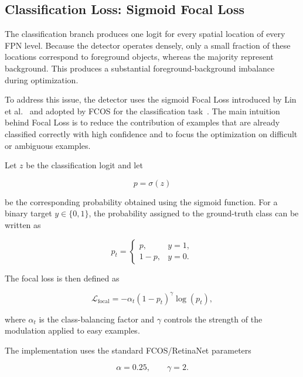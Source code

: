 \documentclass[11pt,a4paper]{article}
\begin{document}
\subsection{Classification Loss: Sigmoid Focal Loss}
\label{subsec:classification_loss}

The classification branch produces one logit for every spatial location of
every FPN level. Because the detector operates densely, only a small
fraction of these locations correspond to foreground objects, whereas the
majority represent background. This produces a substantial
foreground-background imbalance during optimization.

To address this issue, the detector uses the sigmoid Focal Loss introduced by
Lin et al.~\cite{lin2017focal} and adopted by FCOS for the classification
task~\cite{tian2019fcos}. The main intuition behind Focal Loss is to reduce
the contribution of examples that are already classified correctly with
high confidence and to focus the optimization on difficult or ambiguous
examples.

Let $z$ be the classification logit and let

\begin{equation}
p = \sigma(z)
\end{equation}

be the corresponding probability obtained using the sigmoid function. For a
binary target $y\in\{0,1\}$, the probability assigned to the ground-truth
class can be written as

\begin{equation}
p_t =
\begin{cases}
p, & y=1,\\
1-p, & y=0.
\end{cases}
\end{equation}

The focal loss is then defined as

\begin{equation}
\mathcal{L}_{\mathrm{focal}}
=
-\alpha_t(1-p_t)^\gamma\log(p_t),
\end{equation}

where $\alpha_t$ is the class-balancing factor and $\gamma$ controls the
strength of the modulation applied to easy examples.

The implementation uses the standard FCOS/RetinaNet parameters

\begin{equation}
\alpha=0.25,
\qquad
\gamma=2.
\end{equation}
\end{document}
